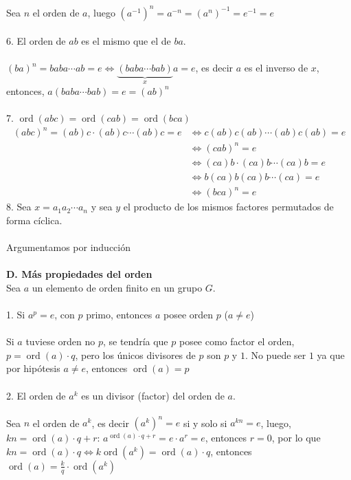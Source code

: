 \documentclass{article}
\begin{document}
\\
\\
Sea $n$ el orden de $a$, luego $(a^{-1})^{n}=a^{-n}=(a^{n})^{-1}=e^{-1}=e$
\\
\\
6. El orden de $ab$ es el mismo que el de $ba$.
\\
\\
$(ba)^{n}=baba \cdots ab=e  \Longleftrightarrow \underbrace{(baba \cdots bab)}_{x}a = e$, es decir $a$ es el inverso de $x$, entonces, $a(baba \cdots bab) = e = (ab)^{n}$
\\
\\
7. $\operatorname{ord}(abc)=\operatorname{ord}(cab)=\operatorname{ord}(bca)$
\begin{equation*}
\begin{aligned}
    (abc)^{n}=(ab)c \cdot (ab)c \cdots (ab)c = e &\Longleftrightarrow c(ab)c(ab) \cdots (ab)c(ab) = e \\
    &\Longleftrightarrow (cab)^{n}=e \\
    &\Longleftrightarrow (ca)b \cdot (ca)b \cdots (ca)b = e \\
    &\Longleftrightarrow b(ca)b(ca)b \cdots (ca) = e \\
    &\Longleftrightarrow (bca)^{n}=e
\end{aligned}
\end{equation*}
8. Sea $x=a_1 a_2 \cdots a_n$ y sea $y$ el producto de los mismos factores permutados de forma cíclica.
\\
\\
Argumentamos por inducción
\\
\\
\textbf{D. Más propiedades del orden}
\\
Sea $a$ un elemento de orden finito en un grupo $G$.
\\
\\
1. Si $a^{p}=e$, con $p$ primo, entonces $a$ posee orden $p$ ($a \neq e$)
\\
\\
Si $a$ tuviese orden no $p$, se tendría que $p$ posee como factor el orden, $p = \operatorname{ord}(a) \cdot q$, pero los únicos divisores de $p$ son $p$ y $1$. No puede ser $1$ ya que por hipótesis $a \neq e$, entonces $\operatorname{ord}(a)=p$
\\
\\
2. El orden de $a^{k}$ es un divisor (factor) del orden de $a$.
\\
\\
Sea $n$ el orden de $a^{k}$, es decir $(a^{k})^{n}=e$ si y solo si $a^{kn}=e$, luego, $kn=\operatorname{ord}(a) \cdot q + r$: $a^{\operatorname{ord}(a) \cdot q + r}=e \cdot a^{r}=e$, entonces $r=0$, por lo que $kn=\operatorname{ord}(a) \cdot q \Longleftrightarrow k \operatorname{ord}(a^{k})= \operatorname{ord}(a) \cdot q$, entonces $\operatorname{ord}(a)=\frac{k}{q} \cdot \operatorname{ord}(a^{k})$
\end{document}
